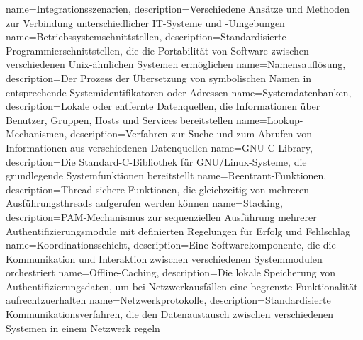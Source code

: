 {
	name={In\-te\-gra\-ti\-ons\-sze\-na\-ri\-en},
	description={Ver\-schie\-de\-ne An\-sät\-ze und Me\-tho\-den zur Ver\-bin\-dung un\-ter\-schied\-li\-cher IT-Sys\-te\-me und -Um\-ge\-bun\-gen}
}
{
	name={Be\-triebs\-sys\-tem\-schnitt\-stel\-len},
	description={Stan\-dar\-di\-sier\-te Pro\-gram\-mier\-schnitt\-stel\-len, die die Por\-ta\-bi\-li\-tät von Soft\-ware zwi\-schen ver\-schie\-de\-nen Unix-ähn\-li\-chen Sys\-te\-men er\-mög\-li\-chen}
}
{
	name={Na\-mens\-auf\-lö\-sung},
	description={Der Pro\-zess der Über\-set\-zung von sym\-bo\-li\-schen Na\-men in ent\-spre\-chen\-de Sys\-tem\-iden\-ti\-fi\-ka\-to\-ren oder Adres\-sen}
}
{
	name={Sys\-tem\-da\-ten\-ban\-ken},
	description={Lo\-ka\-le oder ent\-fern\-te Da\-ten\-quel\-len, die In\-for\-ma\-tio\-nen über Be\-nut\-zer, Grup\-pen, Hosts und Ser\-vices be\-reit\-stel\-len}
}
{
	name={Look\-up-Me\-cha\-nis\-men},
	description={Ver\-fah\-ren zur Su\-che und zum Ab\-ru\-fen von In\-for\-ma\-tio\-nen aus ver\-schie\-de\-nen Da\-ten\-quel\-len}
}
{
	name={GNU C Li\-bra\-ry},
	description={Die Stan\-dard-C-Bi\-blio\-thek für GNU/Li\-nux-Sys\-te\-me, die grund\-le\-gen\-de Sys\-tem\-funk\-tio\-nen be\-reit\-stellt}
}
{
	name={Re\-en\-trant-Funk\-tio\-nen},
	description={Thread-si\-che\-re Funk\-tio\-nen, die gleich\-zei\-tig von meh\-re\-ren Aus\-füh\-rungs\-threads auf\-ge\-ru\-fen wer\-den kön\-nen}
}
{
	name={Sta\-cking},
	description={PAM-Me\-cha\-nis\-mus zur se\-quen\-zi\-el\-len Aus\-füh\-rung meh\-re\-rer Au\-then\-ti\-fi\-zie\-rungs\-mo\-du\-le mit de\-fi\-nier\-ten Re\-ge\-lun\-gen für Er\-folg und Fehl\-schlag}
}
{
	name={Ko\-or\-di\-na\-ti\-ons\-schicht},
	description={Eine Soft\-ware\-kom\-po\-nen\-te, die die Kom\-mu\-ni\-ka\-ti\-on und In\-ter\-ak\-ti\-on zwi\-schen ver\-schie\-de\-nen Sys\-tem\-mo\-du\-len or\-ches\-triert}
}
{
	name={Off\-line-Ca\-ching},
	description={Die lo\-ka\-le Spei\-che\-rung von Au\-then\-ti\-fi\-zie\-rungs\-da\-ten, um bei Netz\-werk\-aus\-fäl\-len eine be\-grenz\-te Funk\-tio\-na\-li\-tät auf\-recht\-zu\-er\-hal\-ten}
}
{
	name={Netz\-werk\-pro\-to\-kol\-le},
	description={Stan\-dar\-di\-sier\-te Kom\-mu\-ni\-ka\-ti\-ons\-ver\-fah\-ren, die den Da\-ten\-aus\-tausch zwi\-schen ver\-schie\-de\-nen Sys\-te\-men in ei\-nem Netz\-werk re\-geln}
}
